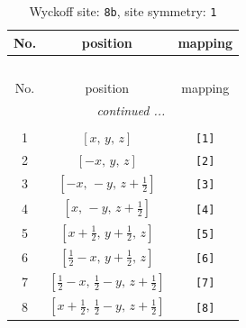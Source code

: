 \documentclass[fleqn,8pt]{jsarticle}
\begin{document}
\begin{longtable}{ccc}
\caption{Wyckoff site: {\tt 8b}, site symmetry: {\tt 1}}
 \\
 \hline \hline
No. & position & mapping \\ \hline \endfirsthead

\multicolumn{2}{l}{\tablename\ \thetable{}} \\
 \hline \hline
No. & position & mapping \\ \hline \endhead

 \hline \hline
\multicolumn{2}{r}{\footnotesize\it continued ...} \\ \endfoot

 \hline \hline
\multicolumn{2}{r}{} \\ \endlastfoot

1 & $\left[ x,\, y,\, z \right]$ & {\tt [1]} \\ \hline
2 & $\left[ - x,\, y,\, z \right]$ & {\tt [2]} \\ \hline
3 & $\left[ - x,\, - y,\, z + \frac{1}{2} \right]$ & {\tt [3]} \\ \hline
4 & $\left[ x,\, - y,\, z + \frac{1}{2} \right]$ & {\tt [4]} \\ \hline
5 & $\left[ x + \frac{1}{2},\, y + \frac{1}{2},\, z \right]$ & {\tt [5]} \\ \hline
6 & $\left[ \frac{1}{2} - x,\, y + \frac{1}{2},\, z \right]$ & {\tt [6]} \\ \hline
7 & $\left[ \frac{1}{2} - x,\, \frac{1}{2} - y,\, z + \frac{1}{2} \right]$ & {\tt [7]} \\ \hline
8 & $\left[ x + \frac{1}{2},\, \frac{1}{2} - y,\, z + \frac{1}{2} \right]$ & {\tt [8]} \\
\end{longtable}
\end{document}
